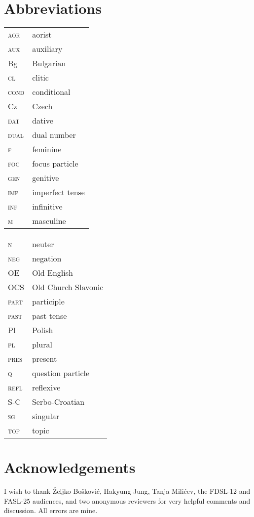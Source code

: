 \documentclass[output=paper,
modfonts,
newtxmath,
hidelinks
]{langscibook}
\begin{document}
\section*{Abbreviations}

\begin{tabularx}{.5\textwidth}{@{}lQ@{}}
\textsc{aor}&aorist\\
\textsc{aux}&auxiliary\\
Bg&Bulgarian\\
\textsc{cl}&clitic\\
\textsc{cond}&conditional\\
Cz&Czech\\
\textsc{dat}&dative\\ 
\textsc{dual}&dual number\\
\textsc{f}&feminine\\
\textsc{foc}&focus particle\\
\textsc{gen}&genitive\\
\textsc{imp}&imperfect tense\\
\textsc{inf}&infinitive\\
\textsc{m}&masculine\\
\end{tabularx}%
\begin{tabularx}{.5\textwidth}{@{}lQ@{}}
\textsc{n}&neuter\\
\textsc{neg}&negation\\
OE&Old English\\
OCS&Old Church Slavonic\\
\textsc{part}&participle\\
\textsc{past}&past tense\\
Pl&Polish\\
\textsc{pl}&plural\\
\textsc{pres}&present\\
\textsc{q}&question particle\\
\textsc{refl}&reflexive\\
S-C&Serbo-Croatian\\
\textsc{sg}&singular\\
\textsc{top}&topic\\
\end{tabularx}

\section*{Acknowledgements}

I wish to thank Željko Bošković, Hakyung Jung, Tanja Milićev, the FDSL-12 and FASL-25 audiences, and two anonymous reviewers for very helpful comments and discussion. All errors are mine.

\sloppy
\printbibliography[heading=subbibliography,notkeyword=this]
\end{document}
